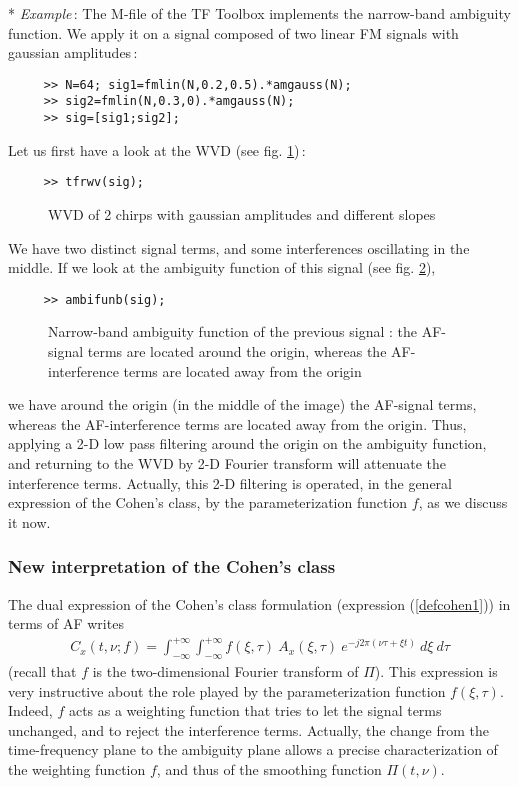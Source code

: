 \begin{itemize}
  * {\it Example}\,: The M-file  of the TF Toolbox implements the narrow-band ambiguity
function. We apply it on a signal composed of two linear FM signals with
gaussian amplitudes\,:
\begin{verbatim}
     >> N=64; sig1=fmlin(N,0.2,0.5).*amgauss(N);
     >> sig2=fmlin(N,0.3,0).*amgauss(N);
     >> sig=[sig1;sig2]; 
\end{verbatim}
Let us first have a look at the WVD (see fig. \ref{En1fig12})\,:
\begin{verbatim}
     >> tfrwv(sig);
\end{verbatim}
\begin{figure}[htb]
\epsfxsize=10cm
\epsfysize=8cm
\centerline{}
\caption{\label{En1fig12}WVD of  2 chirps with gaussian amplitudes and
different slopes}
\end{figure}
We have two distinct signal terms, and some interferences oscillating in
the middle. If we look at the ambiguity function of this signal (see
fig. \ref{En1fig13}),
\begin{verbatim}
     >> ambifunb(sig);
\end{verbatim}
\begin{figure}[htb]
\epsfxsize=10cm
\epsfysize=8cm
\centerline{}
\caption{\label{En1fig13}Narrow-band ambiguity function of the previous
signal : the AF-signal terms are located around the origin, whereas the
AF-interference terms are located away from the origin}
\end{figure}
we have around the origin (in the middle of the image) the AF-signal terms,
whereas the AF-interference terms are located away from the origin. Thus,
applying a 2-D low pass filtering around the origin on the ambiguity
function, and returning to the WVD by 2-D Fourier transform will attenuate
the interference terms. Actually, this 2-D filtering is operated, in the
general expression of the Cohen's class, by the parameterization function $f$,
as we discuss it now.
\end{itemize}

\subsubsection{New interpretation of the Cohen's class}

  The dual expression of the Cohen's class formulation (expression
(\ref{defcohen1})) in terms of AF writes
\begin{eqnarray}
\label{defcohen2}
C_x(t,\nu;f) = \int_{-\infty}^{+\infty} \int_{-\infty}^{+\infty}
f(\xi,\tau)\ A_x(\xi,\tau)\ e^{-j2\pi(\nu \tau+\xi t)}\ d\xi\ d\tau  
\end{eqnarray}
(recall that $f$ is the two-dimensional Fourier transform of $\Pi$).  This
expression is very instructive about the role played by the parameterization
function $f(\xi,\tau)$. Indeed, $f$ acts as a weighting function that tries to
let the signal terms unchanged, and to reject the interference
terms. Actually, the change from the time-frequency plane to the ambiguity
plane allows a precise characterization of the weighting function $f$, and
thus of the smoothing function $\Pi(t,\nu)$.
  

